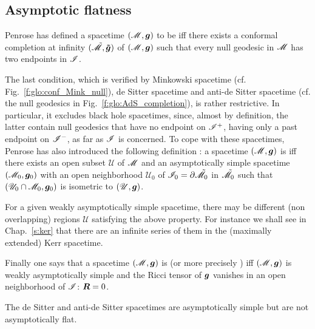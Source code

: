 \subsection{Asymptotic flatness} \label{s:glo:asymp_flat}

Penrose \cite{Penro64,Penro68} has defined
a spacetime $(\mathscr{M},\bm{g})$ to be  iff there exists
a conformal completion at infinity $(\tilde{\mathscr{M}},\bm{\tilde{g}})$
of $(\mathscr{M},\bm{g})$
such that every null geodesic in $\mathscr{M}$ has two endpoints in $\mathscr{I}$.

The last condition, which is verified by Minkowski spacetime (cf. Fig.~\ref{f:glo:conf_Mink_null}),
de Sitter spacetime and anti-de Sitter spacetime (cf. the null geodesics in
Fig.~\ref{f:glo:AdS_completion}), is rather restrictive. In particular, it excludes
black hole spacetimes, since, almost by definition, the latter contain null
geodesics that have no endpoint on $\mathscr{I}^+$, having only a past endpoint
on $\mathscr{I}^-$, as far as $\mathscr{I}$ is concerned. To cope with these spacetimes,
Penrose has also introduced the following definition \cite{Penro68}:
a spacetime $(\mathscr{M},\bm{g})$ is
 iff
there exists an open subset $\mathscr{U}$ of $\mathscr{M}$ and
an asymptotically simple spacetime $(\mathscr{M}_0, \bm{g}_0)$
with an open neighborhood $\mathscr{U}_0$ of $\mathscr{I}_0 = \partial \tilde{\mathscr{M}}_0$
in $\tilde{\mathscr{M}}_0$ such that $(\mathscr{U}_0\cap \mathscr{M}_0,\bm{g}_0)$ is
isometric to $(\mathscr{U},\bm{g})$.

\begin{remark}
For a given weakly asymptotically simple spacetime, there may be different
(non overlapping) regions $\mathscr{U}$ satisfying the above property.
For instance we shall see in Chap.~\ref{s:ker}
that there are an infinite series of them in the (maximally extended) Kerr spacetime.
\end{remark}

Finally one says that a spacetime $(\mathscr{M},\bm{g})$ is
(or more precisely  \cite{HawkiE73})
iff $(\mathscr{M},\bm{g})$ is weakly asymptotically simple and the Ricci tensor of
$\bm{g}$ vanishes in an open neighborhood of $\mathscr{I}$: $\bm{R} = 0$.

\begin{example}
The de Sitter and anti-de Sitter spacetimes are asymptotically simple but
are not asymptotically flat.
\end{example}

